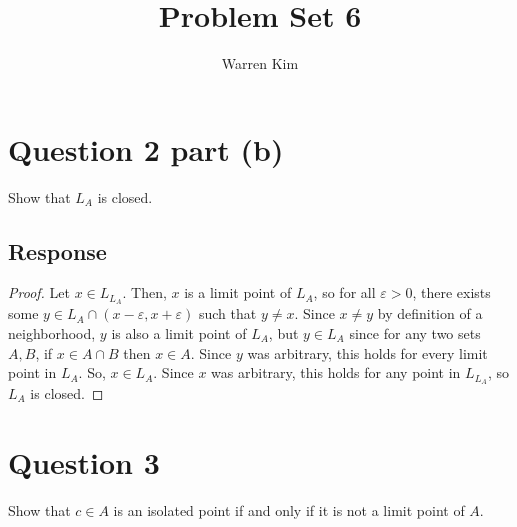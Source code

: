 \documentclass[13pt]{article}
\title{Problem Set 6}
\author{Warren Kim}
\begin{document}
\maketitle

\newpage
\section*{Question 2 part (b)}
Show that $L_A$ is closed.

\subsection*{Response}
\begin{proof}
Let $x \in L_{L_A}$. Then, $x$ is a limit point of $L_A$, so for all
$\varepsilon > 0$, there exists some $y \in L_A \cap (x - \varepsilon,
x + \varepsilon)$ such that $y \neq x$. Since $x \neq y$ by definition
of a neighborhood, $y$ is also a limit point of $L_A$, but $y \in L_A$
since for any two sets $A, B$, if $x \in A \cap B$ then $x \in
A$. Since $y$ was arbitrary, this holds for every limit point in $L_A$. So,
$x \in L_A$. Since $x$ was arbitrary, this holds for any point in
$L_{L_A}$, so $L_A$ is closed.
\end{proof}

\newpage
\section*{Question 3}
Show that $c \in A$ is an isolated point if and only if it is not a
limit point of $A$.
\end{document}
